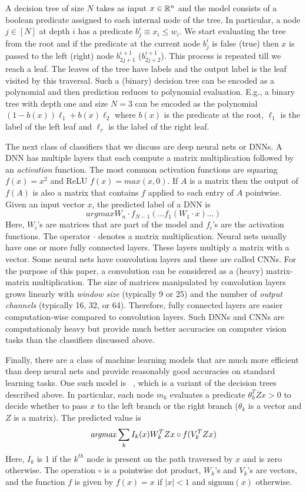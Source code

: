A decision tree of size $N$ takes as input $x\in{\mathbb{R}}^n$ and the model consists of a boolean predicate
assigned to each internal node of the tree. In particular, a node $j\in[N]$ at depth $i$ has a predicate $b_{j}^i\equiv x_i\leq w_i$. We start evaluating the tree from the root and if the predicate at the current node $b_j^i$ is false (true) then $x$ is passed to the left (right) node $b_{2j+1}^{i+1}$ ($b_{2j+2}^{i+1}$). This process is repeated till we reach a leaf. The leaves of the tree have labels and the output label is the leaf visited by this traversal.
Such a (binary) decision tree can be encoded as a polynomial and then prediction
reduces to polynomial evaluation. E.g., a binary tree with depth one and size $N=3$ can be encoded as the polynomial
$(1-b(x))\ell_1 + b(x)\ell_2$ where $b(x)$ is the predicate at the root, $\ell_1$ is the label of the left leaf and $\ell_r$ is the label of the right leaf.

The next class of classifiers that we discuss are deep neural nets or DNNs. 
A DNN has multiple layers that each compute a matrix multiplication followed by
an {\it activation} function. The most common activation functions are 
squaring $f(x)=x^2$ and ReLU $f(x)=\mathit{max}(x,0)$. 
If $A$ is a matrix then the output of $f(A)$ is also a matrix that contains $f$  applied
 to each entry of $A$ pointwise.
Given an input vector $x$, the predicted label of a DNN is
\[
 \mathit{argmax} W_n\cdot f_{N-1}(\ldots f_1(W_1\cdot x)\ldots)
\]
Here, $W_i$'s are matrices that are part of the model and $f_i$'s are the activation functions.
The operator $\cdot$ denotes a matrix multiplication.
Neural nets usually have one or more fully connected layers.
These layers multiply a matrix with a vector.
Some neural nets have convolution layers and these are called CNNs.
For the purpose of this paper, a convolution can be considered as a (heavy) matrix-matrix multiplication. The size of matrices manipulated by convolution layers grows linearly with {\it window size} (typically 9 or 25) and the number of {\it output channels} (typically 16, 32, or 64).
Therefore, fully connected layers are easier computation-wise compared
to convolution layers. Such DNNs and CNNs are computationaly heavy but provide
much better accuracies on computer vision tasks than the classifiers discussed above. 

Finally, there are a class of machine learning models that are much more efficient than
deep neural nets and provide reasonably good accuracies on standard learning tasks. One such model
is \bonsai~\cite{bonsai}, which is a variant of the decision trees described above.
In particular, each node $m_k$ evaluates a predicate $\theta_k^TZx > 0$ to decide whether
to pass $x$ to the left branch or the right branch ($\theta_k$ is a vector and $Z$ is a matrix).
The predicted value is
\[
{\it argmax} \sum_k I_k(x)W_k^TZx\circ f(V_k^TZx) 
\]
Here, $I_k$ is 1 if the $k^{th}$ node is present on the path traversed by $x$
and is zero otherwise. 
The operation $\circ$ is a pointwise dot product, $W_k$'s and $V_k$'s are vectors,  and
the function $f$ is given by $f(x) = x$ if $|x| < 1$ and $\mathrm{signum}(x)$ otherwise.

